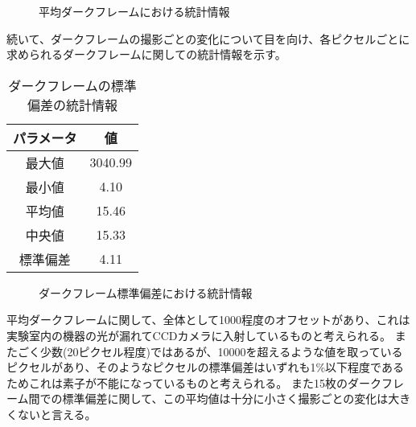 \begin{figure}[!ht]
\centering


\caption[]{平均ダークフレームにおける統計情報}
\label{fig:darkflame_average_stat}
\end{figure}

続いて、ダークフレームの撮影ごとの変化について目を向け、各ピクセルごとに求められるダークフレームに関しての統計情報を示す。

\begin{table}[!ht]
\begin{center}
  \caption{ダークフレームの標準偏差の統計情報}
  \begin{tabular}{|c|c|} \hline
    パラメータ & 値 \\ \hline
    最大値 & 3040.99 \\
    最小値 & 4.10 \\
    平均値 & 15.46 \\
    中央値 & 15.33 \\
    標準偏差 & 4.11 \\ \hline
  \end{tabular}
  \label{tb:darkflame_deviation_data}
\end{center}
\end{table}

\begin{figure}[!ht]
\centering


\caption[]{ダークフレーム標準偏差における統計情報}
\label{fig:darkflame_deviation_stat}
\end{figure}

平均ダークフレームに関して、全体として1000程度のオフセットがあり、これは実験室内の機器の光が漏れてCCDカメラに入射しているものと考えられる。
またごく少数(20ピクセル程度)ではあるが、10000を超えるような値を取っているピクセルがあり、そのようなピクセルの標準偏差はいずれも1\%以下程度であるためこれは素子が不能になっているものと考えられる。
また15枚のダークフレーム間での標準偏差に関して、この平均値は十分に小さく撮影ごとの変化は大きくないと言える。

